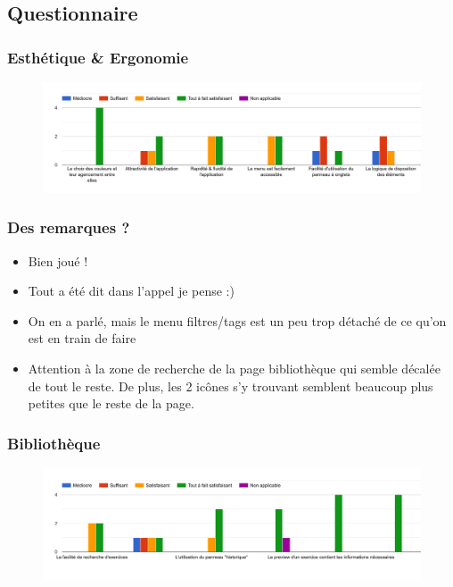 \subsection{Questionnaire}

\subsubsection*{Esthétique \& Ergonomie}

\begin{figure}[H]
    \includegraphics[width=\textwidth,height=0.3\textheight,keepaspectratio]{images/googleForm/ergonomie_2.png}
    \centering
\end{figure}

\subsubsection*{Des remarques ?}

\begin{itemize}
    \item Bien joué !
    \item Tout a été dit dans l'appel je pense :)
    \item On en a parlé, mais le menu filtres/tags est un peu trop détaché de ce qu'on est en train de faire
    \item Attention à la zone de recherche de la page bibliothèque qui semble décalée de tout le reste. De plus, les 2 icônes s'y trouvant semblent beaucoup plus petites que le reste de la page.
\end{itemize}


\subsubsection*{Bibliothèque}

\begin{figure}[H]
    \includegraphics[width=\textwidth,height=0.3\textheight,keepaspectratio]{images/googleForm/bibliotheque_2.png}
    \centering
\end{figure}

